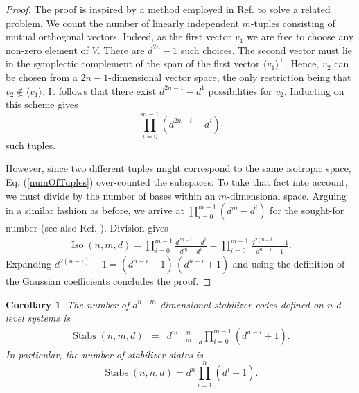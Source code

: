 \documentclass[aps,twocolumn,floatfix]{revtex4}
\newtheorem{corollary}[theorem]{Corollary}
\def\tuple#1.{\langle#1\rangle}
\def\Gauss#1,#2.{{#1\brack#2}_d}
\DeclareMathOperator{\Stabs}{Stabs}
\DeclareMathOperator{\Iso}{Iso}
\begin{document}
\begin{proof}
	The proof is inspired by a method employed in Ref.
	\cite{cameron} to solve a related problem. We count the
	number of linearly independent $m$-tuples consisting of mutual
	orthogonal vectors. Indeed, as the first vector $v_1$ we are free to
	choose any non-zero element of $V$. There are $d^{2n}-1$ such
	choices. The second vector must lie in the symplectic complement of
	the span of the first vector	$\tuple v_1.^\bot$.  Hence, $v_2$ can
	be chosen from a $2n-1$-dimensional vector space, the only
	restriction being that $v_2 \not\in \tuple v_1.$. It follows that
	there exist $d^{2n-1}-d^1$ possibilities for $v_2$. Inducting on
	this scheme gives
	\begin{equation}\label{numOfTuples}
		\prod_{i=0}^{m-1} (d^{2n-i}-d^i)
	\end{equation}
	such tuples.

	However, since two different tuples might correspond to the same
	isotropic space, Eq. (\ref{numOfTuples}) over-counted the subspaces. To
	take that fact into account, we must divide by the number of bases
	within an $m$-dimensional space. Arguing in a similar fashion as
	before, we arrive at
		$\prod_{i=0}^{m-1} (d^{m}-d^i)$
	for the sought-for number (see also Ref. \cite{cameron}). Division gives
	\begin{eqnarray*}
		\Iso(n,m,d)
		=
 		\prod_{i=0}^{m-1} 
 			\frac
 				{d^{2n-i}-d^i}
  			{d^{m}-d^i} 
		=
		\prod_{i=0}^{m-1} 
			\frac
				{d^{2(n-i)}-1}
				{d^{m-i}-1}.
	\end{eqnarray*}
	Expanding 
			$d^{2(n-i)}-1 = (d^{n-i}-1)\,(d^{n-i}+1)$
	and using the definition of the Gaussian coefficients concludes the
	proof.
\end{proof}

\begin{corollary}
	The number of $d^{n-m}$-dimensional stabilizer codes defined on $n$
	$d$-level systems is
	\begin{eqnarray*}
		\Stabs(n,m,d)
		&=&
		d^{m} \Gauss n,m.  \prod_{i=0}^{m-1}(d^{n-i}+1).
	\end{eqnarray*}
	In particular, the number of stabilizer states is
	\begin{equation*}
		\Stabs(n,n,d)=d^n \prod_{i=1}^{n}(d^{i}+1).
	\end{equation*}
\end{corollary}
\end{document}
